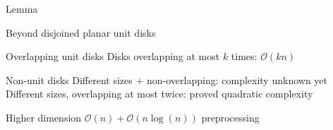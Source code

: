 \documentclass{beamer}
\begin{document}
\begin{frame}{Lemma}
\begin{figure}
\end{figure}

\end{frame}

\begin{frame}{Beyond disjoined planar unit disks}

\begin{block}{Overlapping unit disks}
Disks overlapping at most $k$ times: $\mathcal{O}(k n)$
\end{block}


\begin{block}{Non-unit disks}
Different sizes + non-overlapping: complexity unknown yet\\
Different sizes, overlapping at most twice: proved quadratic complexity
\end{block}

\begin{block}{Higher dimension}
$\mathcal{O}(n) + \mathcal{O}(n \log(n))$ preprocessing
\end{block}


\end{frame}


%
%
%
%
\end{document}
